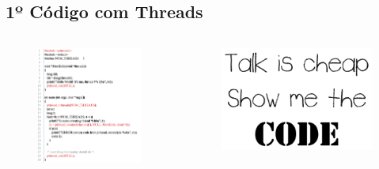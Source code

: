 \documentclass[10pt, xcolor=x11names]{beamer}
\begin{document}
\subsection{1º Código com Threads}
\begin{frame}
	\begin{columns}
			\begin{figure}
				\includegraphics[width=.8\linewidth]{img/code-thread.png}
			\end{figure}
		

		\begin{flushright}
			\begin{figure}
				\includegraphics[width=1\linewidth]{img/torvalds.png}
			\end{figure}
		\end{flushright}	
		
	\end{columns}
\end{frame}
\end{document}
